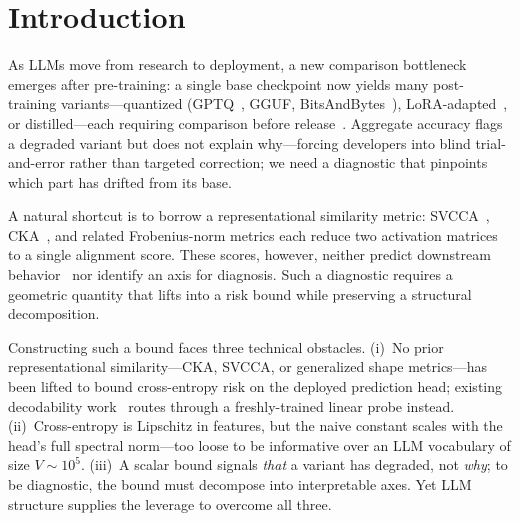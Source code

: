 \section{Introduction}

As LLMs move from research to deployment, a new comparison bottleneck emerges after pre-training: a single base checkpoint now yields many post-training variants---quantized (GPTQ~\cite{frantar2022gptq}, GGUF, BitsAndBytes~\cite{dettmers2022gpt3}), LoRA-adapted~\cite{hu2022lora}, or distilled---each requiring comparison before release~\cite{grattafiori2024llama, qwen2025qwen3}.
Aggregate accuracy flags a degraded variant but does not explain why---forcing developers into blind trial-and-error rather than targeted correction; we need a diagnostic that pinpoints which part has drifted from its base.

A natural shortcut is to borrow a representational similarity metric: SVCCA~\cite{raghu2017svcca}, CKA~\cite{kornblith2019similarity}, and related Frobenius-norm metrics each reduce two activation matrices to a single alignment score.
These scores, however, neither predict downstream behavior~\cite{ding2021grounding, davari2023reliability, klabunde2023similarity} nor identify an axis for diagnosis.
Such a diagnostic requires a geometric quantity that lifts into a risk bound while preserving a structural decomposition.

Constructing such a bound faces three technical obstacles. (i)~No prior representational similarity---CKA, SVCCA, or generalized shape metrics---has been lifted to bound cross-entropy risk on the deployed prediction head; existing decodability work~\cite{harvey2024what} routes through a freshly-trained linear probe instead. (ii)~Cross-entropy is Lipschitz in features, but the naive constant scales with the head's full spectral norm---too loose to be informative over an LLM vocabulary of size $V \sim 10^5$. (iii)~A scalar bound signals \emph{that} a variant has degraded, not \emph{why}; to be diagnostic, the bound must decompose into interpretable axes.
Yet LLM structure supplies the leverage to overcome all three.

